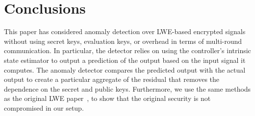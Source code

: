 \documentclass[journal, twoside, web]{ieeecolorpreprint}
\begin{document}




\section{Conclusions}\label{sec:conclusions}
This paper has considered anomaly detection over LWE-based encrypted signals without using secret keys, evaluation keys, or overhead in terms of multi-round communication. In particular, the detector relies on using the controller's intrinsic state estimator to output a prediction of the output based on the input signal it computes. The anomaly detector compares the predicted output with the actual output to create a particular aggregate of the residual that removes the dependence on the secret and public keys. Furthermore, we use the same methods as the original LWE paper~\cite{regev2009}, to show that the original security is not compromised in our setup.
\end{document}
